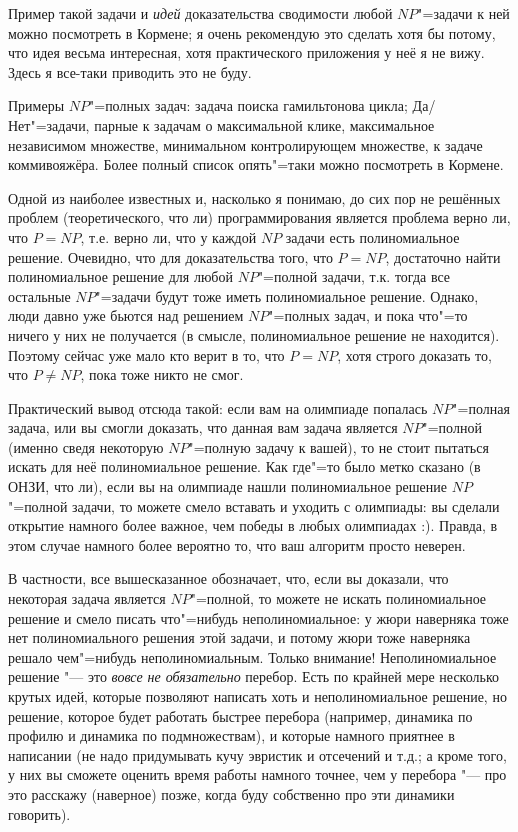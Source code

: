 {Пример такой задачи \A{} и \textit{идей} доказательства сводимости любой 
$NP$"=задачи к ней можно посмотреть в Кормене; я очень рекомендую это сделать 
хотя бы потому, что идея весьма интересная, хотя практического приложения у неё 
я не вижу. Здесь я все-таки приводить это не буду.

Примеры $NP$"=полных задач: задача поиска гамильтонова цикла; Да/Нет"=задачи, 
парные к задачам о максимальной клике, максимальное независимом множестве, 
минимальном контролирующем множестве, к задаче коммивояжёра. Более полный 
список опять"=таки можно посмотреть в Кормене.

 Одной из наиболее известных и, 
насколько я понимаю, до сих пор не решённых проблем (теоретического, что ли) программирования 
является проблема верно ли, что $P=NP$, т.е. верно ли, что у каждой $NP$ задачи есть  
полиномиальное решение. Очевидно, что для доказательства того, что $P=NP$, достаточно найти 
полиномиальное решение для любой $NP$"=полной задачи, т.к. тогда все остальные $NP$"=задачи будут 
тоже иметь полиномиальное решение. Однако, люди давно уже бьются над решением $NP$"=полных 
задач, и пока что"=то ничего у них не получается (в смысле, полиномиальное решение не 
находится). Поэтому сейчас уже мало кто верит в то, что $P=NP$, хотя строго доказать то, что 
$P\neq NP$, пока тоже никто не смог.

Практический вывод отсюда такой: если вам на олимпиаде попалась $NP$"=полная задача, или вы 
смогли доказать, что данная вам задача является $NP$"=полной (именно сведя некоторую 
$NP$"=полную задачу к вашей), то не стоит пытаться искать для неё полиномиальное решение. Как 
где"=то было метко сказано (в ОНЗИ, что ли), если вы на олимпиаде нашли полиномиальное решение $NP$"=полной 
задачи, то можете смело вставать и уходить с олимпиады: вы сделали открытие намного более 
важное, чем победы в любых олимпиадах :). Правда, в этом случае намного более вероятно то, что 
ваш алгоритм просто неверен.

В частности, все вышесказанное обозначает, что, если вы доказали, что некоторая задача 
является $NP$"=полной, то можете не искать полиномиальное решение и смело писать что"=нибудь 
неполиномиальное: у жюри наверняка тоже нет полиномиального решения этой задачи, и потому жюри 
тоже наверняка решало чем"=нибудь неполиномиальным. Только внимание! Неполиномиальное решение 
"--- это \textit{вовсе не обязательно} перебор. Есть по крайней мере несколько крутых идей, которые 
позволяют написать хоть и неполиномиальное решение, но решение, которое будет работать быстрее 
перебора (например, динамика по профилю и динамика по подмножествам), и которые намного приятнее 
в написании (не надо придумывать кучу эвристик и отсечений и т.д.; а кроме того, у них вы 
сможете оценить время работы намного точнее, чем у перебора "--- про это расскажу (наверное) 
позже, когда буду собственно про эти динамики говорить).

}

